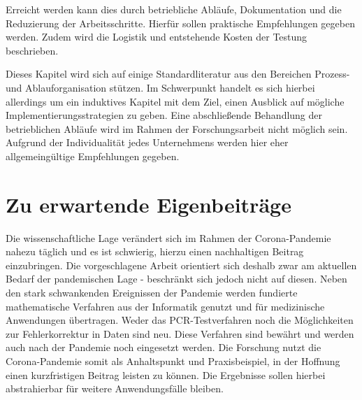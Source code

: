 Erreicht werden kann dies durch betriebliche Abläufe, Dokumentation und die Reduzierung der Arbeitsschritte.
Hierfür sollen praktische Empfehlungen gegeben werden.
Zudem wird die Logistik und entstehende Kosten der Testung beschrieben.

Dieses Kapitel wird sich auf einige Standardliteratur aus den Bereichen Prozess- und Ablauforganisation stützen.
Im Schwerpunkt handelt es sich hierbei allerdings um ein induktives Kapitel mit dem Ziel, einen Ausblick auf mögliche Implementierungsstrategien zu geben.
Eine abschließende Behandlung der betrieblichen Abläufe wird im Rahmen der Forschungsarbeit nicht möglich sein.
Aufgrund der Individualität jedes Unternehmens werden hier eher allgemeingültige Empfehlungen gegeben.

\section{Zu erwartende Eigenbeiträge}
Die wissenschaftliche Lage verändert sich im Rahmen der Corona-Pandemie nahezu täglich und es ist schwierig, hierzu einen nachhaltigen Beitrag einzubringen.
Die vorgeschlagene Arbeit orientiert sich deshalb zwar am aktuellen Bedarf der pandemischen Lage - beschränkt sich jedoch nicht auf diesen.
Neben den stark schwankenden Ereignissen der Pandemie werden fundierte mathematische Verfahren aus der Informatik genutzt und für medizinische Anwendungen übertragen.
Weder das PCR-Testverfahren noch die Möglichkeiten zur Fehlerkorrektur in Daten sind neu.
Diese Verfahren sind bewährt und werden auch nach der Pandemie noch eingesetzt werden.
Die Forschung nutzt die Corona-Pandemie somit als Anhaltspunkt und Praxisbeispiel, in der Hoffnung einen kurzfristigen Beitrag leisten zu können.
Die Ergebnisse sollen hierbei abstrahierbar für weitere Anwendungsfälle bleiben.